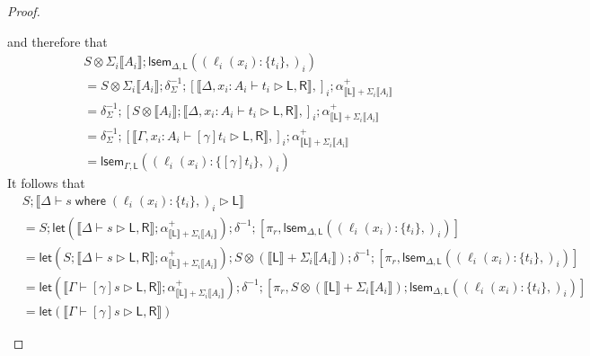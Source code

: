 \documentclass[acmsmall,screen,review]{acmart}
\newcommand{\ms}[1]{\ensuremath{\mathsf{#1}}}
\newcommand{\lto}{:}
\newcommand{\where}[2]{#1\;\ms{where}\;#2}
\newcommand{\wbranch}[3]{#1(#2) \lto \{#3\}}
\newcommand{\bhyp}[2]{#1 : #2}
\newcommand{\haslb}[3]{#1 \vdash #2 \rhd #3}
\newcommand{\dnt}[1]{\llbracket{#1}\rrbracket}
\newcommand{\loopmor}[3]{\ms{lsem}_{#1, #3}(#2)}
\newcommand{\lmor}[1]{\ms{let}(#1)}
\begin{document}
\begin{proof}
\begin{itemize}[leftmargin=*]
\begin{equation}
    \end{equation}
    and therefore that
    \begin{equation}
      \begin{aligned}
        & S \otimes \Sigma_i\dnt{A_i} 
        ; \loopmor{\Delta}{(\wbranch{\ell_i}{x_i}{t_i},)_i}{\ms{L}} \\
        & = S \otimes \Sigma_i\dnt{A_i} 
        ; \delta^{-1}_{\Sigma} ; 
        [ 
          \dnt{\haslb{\Delta, \bhyp{x_i}{A_i}}{t_i}{\ms{L}, \ms{R}}},
        ]_i
        ; \alpha^+_{\dnt{\ms{L}} + \Sigma_i \dnt{A_i}} \\
        & = \delta^{-1}_{\Sigma} ; 
        [ 
          S \otimes \dnt{A_i} ;
          \dnt{\haslb{\Delta, \bhyp{x_i}{A_i}}{t_i}{\ms{L}, \ms{R}}},
        ]_i
        ; \alpha^+_{\dnt{\ms{L}} + \Sigma_i \dnt{A_i}} \\
        & = \delta^{-1}_{\Sigma} ; 
        [ 
          \dnt{\haslb{\Gamma, \bhyp{x_i}{A_i}}{[\gamma]t_i}{\ms{L}, \ms{R}}},
        ]_i
        ; \alpha^+_{\dnt{\ms{L}} + \Sigma_i \dnt{A_i}} \\
        & = \loopmor{\Gamma}{(\wbranch{\ell_i}{x_i}{[\gamma]t_i},)_i}{\ms{L}}
      \end{aligned}
    \end{equation}
    It follows that
    \begin{equation}
      \begin{aligned}
        & S
          ; \dnt{\haslb{\Delta}{\where{s}{(\wbranch{\ell_i}{x_i}{t_i},)_i}}{\ms{L}}} \\
        & = S
          ; \lmor{\dnt{\haslb{\Delta}{s}{\ms{L}, \ms{R}}} 
            ; \alpha^+_{\dnt{\ms{L}} + \Sigma_i \dnt{A_i}}}
          ; \delta^{-1}
          ; [\pi_r, \loopmor{\Delta}{(\wbranch{\ell_i}{x_i}{t_i},)_i}{\ms{L}}] \\
        & = \lmor{S ; \dnt{\haslb{\Delta}{s}{\ms{L}, \ms{R}}} 
            ; \alpha^+_{\dnt{\ms{L}} + \Sigma_i \dnt{A_i}}}
          ; S \otimes (\dnt{\ms{L}} + \Sigma_i \dnt{A_i})
          ; \delta^{-1}
          ; [\pi_r, \loopmor{\Delta}{(\wbranch{\ell_i}{x_i}{t_i},)_i}{\ms{L}}] \\
        & = \lmor{\dnt{\haslb{\Gamma}{[\gamma]s}{\ms{L}, \ms{R}}} 
            ; \alpha^+_{\dnt{\ms{L}} + \Sigma_i \dnt{A_i}}}
          ; \delta^{-1}
          ; [\pi_r, 
            S \otimes (\dnt{\ms{L}} + \Sigma_i \dnt{A_i}) 
            ; \loopmor{\Delta}{(\wbranch{\ell_i}{x_i}{t_i},)_i}{\ms{L}}] \\
        & = \lmor{\dnt{\haslb{\Gamma}{[\gamma]s}{\ms{L}, \ms{R}}} 
}
\end{aligned}
\end{equation}
\end{itemize}
\end{proof}
\end{document}
